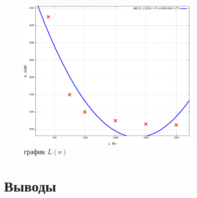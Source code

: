 \documentclass{article}
\begin{document}
\begin{figure}[H]
    \centering
    \includegraphics[width=0.8\textwidth]{6.png}
    \caption{график \( L(\nu) \)}
\end{figure}


\section{Выводы}
\end{document}

